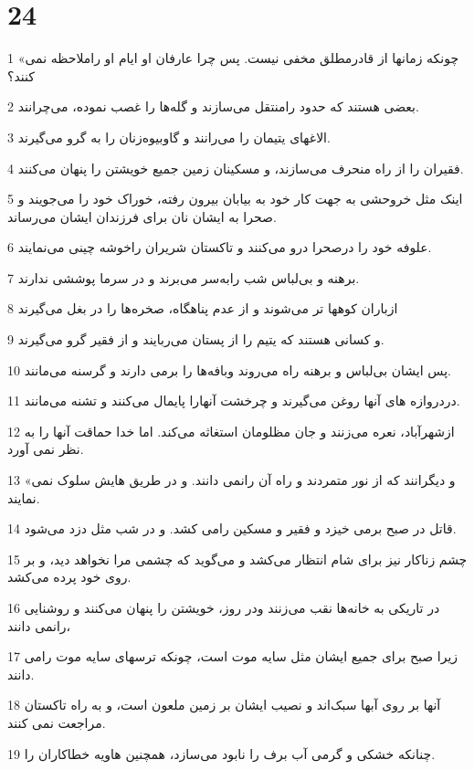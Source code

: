 \chapter{24}

\par 1 «چونکه زمانها از قادرمطلق مخفی نیست. پس چرا عارفان او ایام او راملاحظه نمی کنند؟
\par 2 بعضی هستند که حدود رامنتقل می‌سازند و گله‌ها را غصب نموده، می‌چرانند.
\par 3 الاغهای یتیمان را می‌رانند و گاوبیوه‌زنان را به گرو می‌گیرند.
\par 4 فقیران را از راه منحرف می‌سازند، و مسکینان زمین جمیع خویشتن را پنهان می‌کنند.
\par 5 اینک مثل خروحشی به جهت کار خود به بیابان بیرون رفته، خوراک خود را می‌جویند و صحرا به ایشان نان برای فرزندان ایشان می‌رساند.
\par 6 علوفه خود را درصحرا درو می‌کنند و تاکستان شریران راخوشه چینی می‌نمایند.
\par 7 برهنه و بی‌لباس شب رابه‌سر می‌برند و در سرما پوششی ندارند.
\par 8 ازباران کوهها تر می‌شوند و از عدم پناهگاه، صخره‌ها را در بغل می‌گیرند
\par 9 و کسانی هستند که یتیم را از پستان می‌ربایند و از فقیر گرو می‌گیرند.
\par 10 پس ایشان بی‌لباس و برهنه راه می‌روند وبافه‌ها را برمی دارند و گرسنه می‌مانند.
\par 11 دردروازه های آنها روغن می‌گیرند و چرخشت آنهارا پایمال می‌کنند و تشنه می‌مانند.
\par 12 ازشهرآباد، نعره می‌زنند و جان مظلومان استغاثه می‌کند. اما خدا حماقت آنها را به نظر نمی آورد.
\par 13 «و دیگرانند که از نور متمردند و راه آن رانمی دانند. و در طریق هایش سلوک نمی نمایند.
\par 14 قاتل در صبح برمی خیزد و فقیر و مسکین رامی کشد. و در شب مثل دزد می‌شود.
\par 15 چشم زناکار نیز برای شام انتظار می‌کشد و می‌گوید که چشمی مرا نخواهد دید، و بر روی خود پرده می‌کشد.
\par 16 در تاریکی به خانه‌ها نقب می‌زنند ودر روز، خویشتن را پنهان می‌کنند و روشنایی رانمی دانند،
\par 17 زیرا صبح برای جمیع ایشان مثل سایه موت است، چونکه ترسهای سایه موت رامی دانند.
\par 18 آنها بر روی آبها سبک‌اند و نصیب ایشان بر زمین ملعون است، و به راه تاکستان مراجعت نمی کنند.
\par 19 چنانکه خشکی و گرمی آب برف را نابود می‌سازد، همچنین هاویه خطاکاران را.
